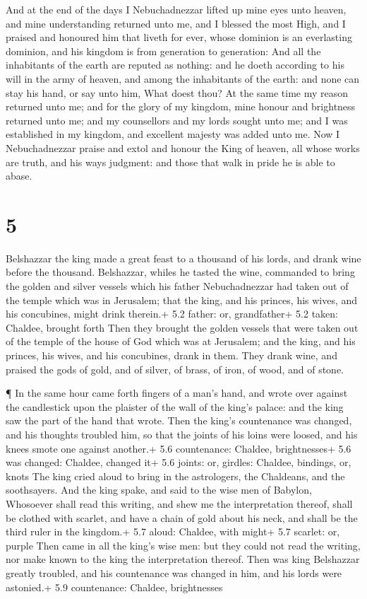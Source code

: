  And at the end of the days I Nebuchadnezzar lifted up mine
eyes unto heaven, and mine understanding returned unto me, and I blessed
the most High, and I praised and honoured him that liveth for ever,
whose dominion is an everlasting dominion, and his kingdom is from
generation to generation:  And all the inhabitants of the
earth are reputed as nothing: and he doeth according to his will in the
army of heaven, and among the inhabitants of the earth: and none can
stay his hand, or say unto him, What doest thou?  At the
same time my reason returned unto me; and for the glory of my kingdom,
mine honour and brightness returned unto me; and my counsellors and my
lords sought unto me; and I was established in my kingdom, and excellent
majesty was added unto me.  Now I Nebuchadnezzar praise and
extol and honour the King of heaven, all whose works are truth, and his
ways judgment: and those that walk in pride he is able to abase.

\hypertarget{section-4}{%
\section{5}\label{section-4}}

 Belshazzar the king made a great feast to a thousand of his
lords, and drank wine before the thousand.  Belshazzar,
whiles he tasted the wine, commanded to bring the golden and silver
vessels which his father Nebuchadnezzar had taken out of the temple
which was in Jerusalem; that the king, and his princes, his wives, and
his concubines, might drink therein.+ 5.2 father: or, grandfather+ 5.2
taken: Chaldee, brought forth  Then they brought the golden
vessels that were taken out of the temple of the house of God which was
at Jerusalem; and the king, and his princes, his wives, and his
concubines, drank in them.  They drank wine, and praised the
gods of gold, and of silver, of brass, of iron, of wood, and of stone.

 ¶ In the same hour came forth fingers of a man's hand, and
wrote over against the candlestick upon the plaister of the wall of the
king's palace: and the king saw the part of the hand that wrote.
 Then the king's countenance was changed, and his thoughts
troubled him, so that the joints of his loins were loosed, and his knees
smote one against another.+ 5.6 countenance: Chaldee, brightnesses+ 5.6
was changed: Chaldee, changed it+ 5.6 joints: or, girdles: Chaldee,
bindings, or, knots  The king cried aloud to bring in the
astrologers, the Chaldeans, and the soothsayers. And the king spake, and
said to the wise men of Babylon, Whosoever shall read this writing, and
shew me the interpretation thereof, shall be clothed with scarlet, and
have a chain of gold about his neck, and shall be the third ruler in the
kingdom.+ 5.7 aloud: Chaldee, with might+ 5.7 scarlet: or, purple
 Then came in all the king's wise men: but they could not
read the writing, nor make known to the king the interpretation thereof.
 Then was king Belshazzar greatly troubled, and his
countenance was changed in him, and his lords were astonied.+ 5.9
countenance: Chaldee, brightnesses

